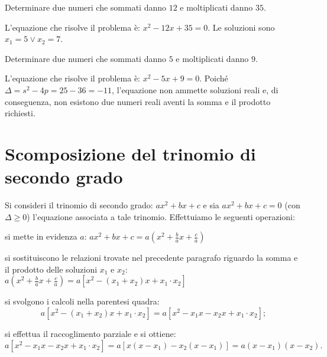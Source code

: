 \begin{exrig}
\begin{esempio}
Determinare due numeri che sommati danno $12$ e moltiplicati danno $35$.

L'equazione che risolve il problema è: $x^{2} - 12 x + 35 = 0$. Le soluzioni 
sono $x_{1} = 5 \vee x_{2} = 7$.
\end{esempio}

\begin{esempio}
Determinare due numeri che sommati danno $5$ e moltiplicati danno $9$.

L'equazione che risolve il problema è: $x^{2} - 5 x + 9 = 0$. Poiché $\Delta = 
s^{2} - 4 p = 25 - 36 = - 11$, l'equazione non ammette soluzioni reali e, di 
conseguenza, non esistono due numeri reali aventi la somma e il prodotto 
richiesti.
\end{esempio}
\end{exrig}

\section{Scomposizione del trinomio di secondo grado}
\label{sec:eq2gr_scomposizione_trinomio}

Si consideri il trinomio di secondo grado: $a x^{2} + b x + c$ e sia $a x^{2} + 
b x + c = 0$ (con $\Delta \geq 0$) l'equazione associata a tale trinomio. 
Effettuiamo le seguenti operazioni:
\begin{itemize*}
\item si mette in evidenza $a$: $a x^{2} + b x + c = a \left( x^{2} + 
\frac{b}{a} x + \frac{c}{a} \right)$
\item si sostituiscono le relazioni trovate nel precedente paragrafo riguardo la 
somma e il prodotto delle soluzioni $x_{1}$ e $x_{2}$: $a \left( x^{2} + 
\frac{b}{a} x + \frac{c}{a} \right) = a \left[x^{2} - ( x_{1} + x_{2} ) x + 
x_{1} \cdot x_{2} \right]$
\item si svolgono i calcoli nella parentesi quadra:
\[a \left[ x^{2} - ( x_{1} + x_{2} ) x + x_{1} \cdot x_{2}\right] = a\left[ 
x^{2} - x_{1} x - x_{2} x + x_{1} \cdot x_{2}\right];\]
\item si effettua il raccoglimento parziale e si ottiene:
\[a \left[x^{2} - x_{1} x - x_{2} x + x_{1} \cdot x_{2}\right] = a \left[ {x 
\left(x - x_{1} \right) - x_{2} \left( x - x_{1}\right)}\right] = a \left( x - 
x_{1} \right) \left( x - x_{2} \right).\]
\end{itemize*}

